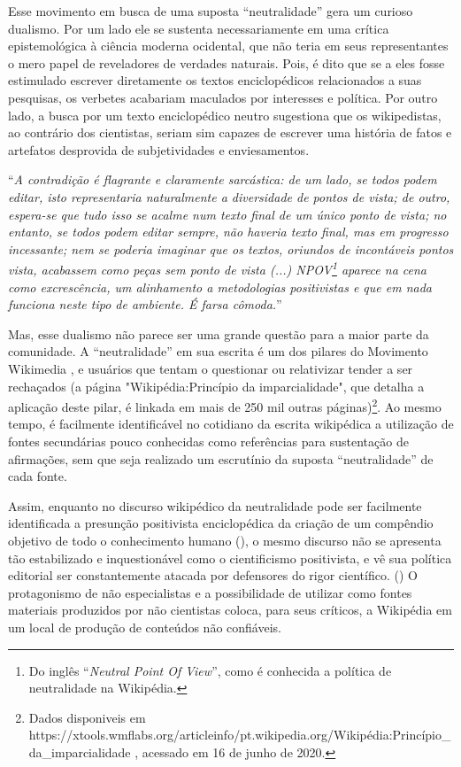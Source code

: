 Esse movimento em busca de uma suposta ``neutralidade'' gera um curioso dualismo. Por um lado ele se sustenta necessariamente em uma crítica epistemológica à ciência moderna ocidental, que não teria em seus representantes o mero papel de reveladores de verdades naturais. Pois, é dito que se a eles fosse estimulado escrever diretamente os textos enciclopédicos relacionados a suas pesquisas, os verbetes acabariam maculados por interesses e política. Por outro lado, a busca por um texto enciclopédico neutro sugestiona que os wikipedistas, ao contrário dos cientistas, seriam sim capazes de escrever uma história de fatos e artefatos desprovida de subjetividades e enviesamentos.

``\textit{A contradição é flagrante e claramente sarcástica: de um lado, se todos podem editar, isto representaria naturalmente a diversidade de pontos de vista; de outro, espera-se que tudo isso se acalme num texto final de um único ponto de vista; no entanto, se todos podem editar sempre, não haveria texto final, mas em progresso incessante; nem se poderia imaginar que os textos, oriundos de incontáveis pontos vista, acabassem como peças sem ponto de vista (...) NPOV\footnote{Do inglês ``\textit{Neutral Point Of View}'', como é conhecida a política de neutralidade na Wikipédia.} aparece na cena como excrescência, um alinhamento a metodologias positivistas e que em nada funciona neste tipo de ambiente. É farsa cômoda.}'' \citep{demo_conhecimento_2009}

Mas, esse dualismo não parece ser uma grande questão para a maior parte da comunidade. A ``neutralidade'' em sua escrita é um dos pilares do Movimento Wikimedia , e usuários que tentam o questionar ou relativizar tender a ser rechaçados (a página "Wikipédia:Princípio da imparcialidade", que detalha a aplicação deste pilar, é linkada em mais de 250 mil outras páginas)\footnote{Dados disponiveis em https://xtools.wmflabs.org/articleinfo/pt.wikipedia.org/Wikipédia:Princípio\_da\_imparcialidade , acessado em 16 de junho de 2020.}. Ao mesmo tempo, é facilmente identificável no cotidiano da escrita wikipédica a utilização de fontes secundárias pouco conhecidas como referências para sustentação de afirmações, sem que seja realizado um escrutínio da suposta ``neutralidade'' de cada fonte. 

Assim, enquanto no discurso wikipédico da neutralidade pode ser facilmente identificada a presunção positivista enciclopédica da criação de um compêndio objetivo de todo o conhecimento humano (\citep{esteves_as_2014}), o mesmo discurso não se apresenta tão estabilizado e inquestionável como o cientificismo positivista, e vê sua política editorial ser constantemente atacada por defensores do rigor científico. (\citep{taraborelli_expert_2011}) O protagonismo de não especialistas e a possibilidade de utilizar como fontes materiais produzidos por não cientistas coloca, para seus críticos, a Wikipédia em um local de produção de conteúdos não confiáveis.

